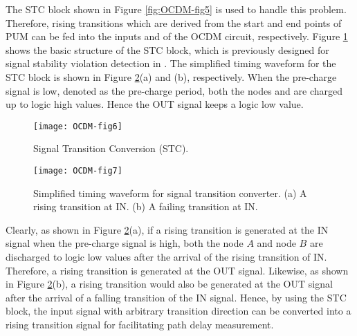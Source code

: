 The STC block shown in Figure \ref{fig:OCDM-fig5} is used to handle this problem. Therefore, rising transitions which are derived from the start and end points of PUM can be fed into the inputs and of the OCDM circuit, respectively. Figure \ref{fig:OCDM-fig6} shows the basic structure of the STC block, which is previously designed for signal stability violation detection in \cite{favalli1996sensing} \cite{agarwal2007circuit} \cite{SVFD_09}. The simplified timing waveform for the STC block is shown in Figure \ref{fig:OCDM-fig7}(a) and (b), respectively. When the pre-charge signal is low, denoted as the pre-charge period, both the nodes and are charged up to logic high values. Hence the OUT signal keeps a logic low value.

\begin{figure}[t]
\centering
\texttt{[image: OCDM-fig6]}
    \caption{Signal Transition Conversion (STC).}
    \label{fig:OCDM-fig6}
\end{figure}

\begin{figure}[t]
\centering
\texttt{[image: OCDM-fig7]}
    \caption{Simplified timing waveform for signal transition converter. (a) A rising transition at IN. (b) A failing transition at IN.}
    \label{fig:OCDM-fig7}
\end{figure}


Clearly, as shown in Figure \ref{fig:OCDM-fig7}(a), if a rising transition is generated at the IN signal when the pre-charge signal is high, both the node $A$ and node $B$ are discharged to logic low values after the arrival of the rising transition of IN. Therefore, a rising transition is generated at the OUT signal. Likewise, as shown in Figure \ref{fig:OCDM-fig7}(b), a rising transition would also be generated at the OUT signal after the arrival of a falling transition of the IN signal. Hence, by using the STC block, the input signal with arbitrary transition direction can be converted into a rising transition signal for facilitating path delay measurement.

